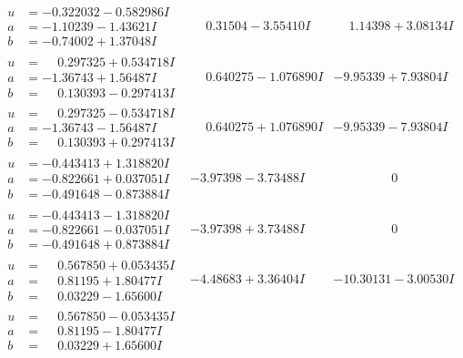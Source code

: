 \documentclass[1p]{elsarticle_modified}
\theoremstyle{definition}
\begin{document}
$$\begin{array}{c|c|c}
\begin{aligned}
u &= -0.322032 - 0.582986 I \\
a &= -1.10239 - 1.43621 I \\
b &= -0.74002 + 1.37048 I\end{aligned}
 & \phantom{-}0.31504 - 3.55410 I & \phantom{-}1.14398 + 3.08134 I \\ \hline\begin{aligned}
u &= \phantom{-}0.297325 + 0.534718 I \\
a &= -1.36743 + 1.56487 I \\
b &= \phantom{-}0.130393 - 0.297413 I\end{aligned}
 & \phantom{-}0.640275 - 1.076890 I & -9.95339 + 7.93804 I \\ \hline\begin{aligned}
u &= \phantom{-}0.297325 - 0.534718 I \\
a &= -1.36743 - 1.56487 I \\
b &= \phantom{-}0.130393 + 0.297413 I\end{aligned}
 & \phantom{-}0.640275 + 1.076890 I & -9.95339 - 7.93804 I \\ \hline\begin{aligned}
u &= -0.443413 + 1.318820 I \\
a &= -0.822661 + 0.037051 I \\
b &= -0.491648 - 0.873884 I\end{aligned}
 & -3.97398 - 3.73488 I & \phantom{-0.000000 } 0 \\ \hline\begin{aligned}
u &= -0.443413 - 1.318820 I \\
a &= -0.822661 - 0.037051 I \\
b &= -0.491648 + 0.873884 I\end{aligned}
 & -3.97398 + 3.73488 I & \phantom{-0.000000 } 0 \\ \hline\begin{aligned}
u &= \phantom{-}0.567850 + 0.053435 I \\
a &= \phantom{-}0.81195 + 1.80477 I \\
b &= \phantom{-}0.03229 - 1.65600 I\end{aligned}
 & -4.48683 + 3.36404 I & -10.30131 - 3.00530 I \\ \hline\begin{aligned}
u &= \phantom{-}0.567850 - 0.053435 I \\
a &= \phantom{-}0.81195 - 1.80477 I \\
b &= \phantom{-}0.03229 + 1.65600 I\end{aligned}

\end{array}$$
\end{document}
